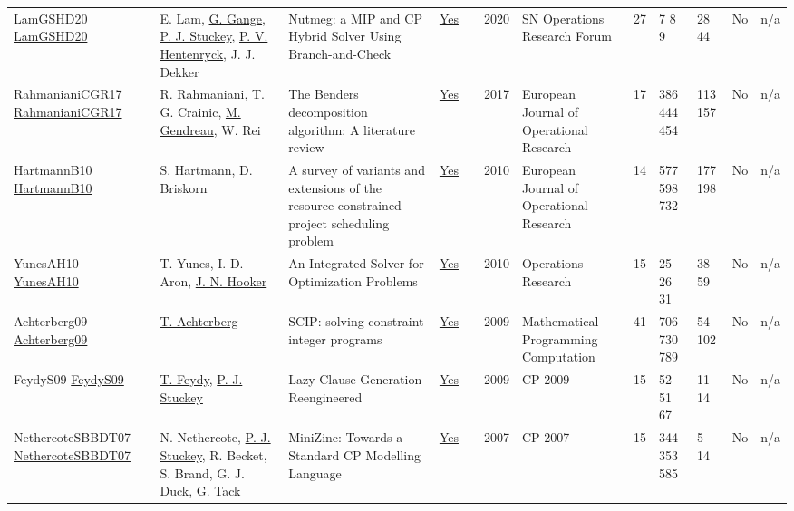 {\begin{longtable}{>{\raggedright\arraybackslash}p{3cm}>{\raggedright\arraybackslash}p{4.5cm}>{\raggedright\arraybackslash}p{6.0cm}rrrp{2.5cm}rp{1cm}p{1cm}rr}
LamGSHD20 \href{http://dx.doi.org/10.1007/s43069-020-00023-2}{LamGSHD20} & E. Lam, \hyperref[auth:a185]{G. Gange}, \hyperref[auth:a125]{P. J. Stuckey}, \hyperref[auth:a148]{P. V. Hentenryck}, J. J. Dekker & \cellcolor{gold!20}Nutmeg: a MIP and CP Hybrid Solver Using Branch-and-Check & \href{../works/LamGSHD20.pdf}{Yes} & \cite{LamGSHD20} & 2020 & SN Operations Research Forum & 27 & 7 8 9 & 28 44 & No & n/a\\
RahmanianiCGR17 \href{http://dx.doi.org/10.1016/j.ejor.2016.12.005}{RahmanianiCGR17} & R. Rahmaniani, T. G. Crainic, \hyperref[auth:a616]{M. Gendreau}, W. Rei & The Benders decomposition algorithm: A literature review & \href{../works/RahmanianiCGR17.pdf}{Yes} & \cite{RahmanianiCGR17} & 2017 & European Journal of Operational Research & 17 & 386 444 454 & 113 157 & No & n/a\\
HartmannB10 \href{http://dx.doi.org/10.1016/j.ejor.2009.11.005}{HartmannB10} & S. Hartmann, D. Briskorn & \cellcolor{green!10}A survey of variants and extensions of the resource-constrained project scheduling problem & \href{../works/HartmannB10.pdf}{Yes} & \cite{HartmannB10} & 2010 & European Journal of Operational Research & 14 & 577 598 732 & 177 198 & No & n/a\\
YunesAH10 \href{http://dx.doi.org/10.1287/opre.1090.0733}{YunesAH10} & T. Yunes, I. D. Aron, \hyperref[auth:a160]{J. N. Hooker} & An Integrated Solver for Optimization Problems & \href{../works/YunesAH10.pdf}{Yes} & \cite{YunesAH10} & 2010 & \cellcolor{red!20}Operations Research & 15 & 25 26 31 & 38 59 & No & n/a\\
Achterberg09 \href{http://dx.doi.org/10.1007/s12532-008-0001-1}{Achterberg09} & \hyperref[auth:a1045]{T. Achterberg} & SCIP: solving constraint integer programs & \href{../works/Achterberg09.pdf}{Yes} & \cite{Achterberg09} & 2009 & Mathematical Programming Computation & 41 & 706 730 789 & 54 102 & No & n/a\\
FeydyS09 \href{https://doi.org/10.1007/978-3-642-04244-7_29}{FeydyS09} & \hyperref[auth:a154]{T. Feydy}, \hyperref[auth:a125]{P. J. Stuckey} & Lazy Clause Generation Reengineered & \href{../works/FeydyS09.pdf}{Yes} & \cite{FeydyS09} & 2009 & CP 2009 & 15 & 52 51 67 & 11 14 & No & n/a\\
NethercoteSBBDT07 \href{https://doi.org/10.1007/978-3-540-74970-7_38}{NethercoteSBBDT07} & N. Nethercote, \hyperref[auth:a125]{P. J. Stuckey}, R. Becket, S. Brand, G. J. Duck, G. Tack & MiniZinc: Towards a Standard {CP} Modelling Language & \href{../works/NethercoteSBBDT07.pdf}{Yes} & \cite{NethercoteSBBDT07} & 2007 & CP 2007 & 15 & 344 353 585 & 5 14 & No & n/a\\

\end{longtable}}
